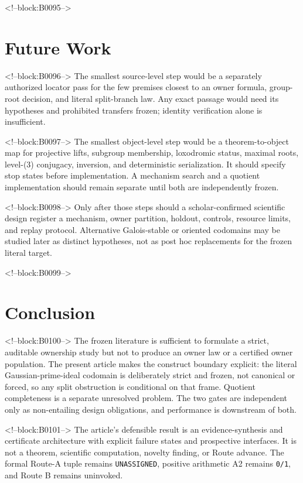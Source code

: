 \documentclass[11pt,a4paper]{article}
\begin{document}
<!--block:B0095-->
\section{Future Work}

<!--block:B0096-->
The smallest source-level step would be a separately authorized locator pass for the few premises closest to an owner formula, group-root decision, and literal split-branch law. Any exact passage would need its hypotheses and prohibited transfers frozen; identity verification alone is insufficient.

<!--block:B0097-->
The smallest object-level step would be a theorem-to-object map for projective lifts, subgroup membership, loxodromic status, maximal roots, level-(3) conjugacy, inversion, and deterministic serialization. It should specify stop states before implementation. A mechanism search and a quotient implementation should remain separate until both are independently frozen.

<!--block:B0098-->
Only after those steps should a scholar-confirmed scientific design register a mechanism, owner partition, holdout, controls, resource limits, and replay protocol. Alternative Galois-stable or oriented codomains may be studied later as distinct hypotheses, not as post hoc replacements for the frozen literal target.

<!--block:B0099-->
\section{Conclusion}

<!--block:B0100-->
The frozen literature is sufficient to formulate a strict, auditable ownership study but not to produce an owner law or a certified owner population. The present article makes the construct boundary explicit: the literal Gaussian-prime-ideal codomain is deliberately strict and frozen, not canonical or forced, so any split obstruction is conditional on that frame. Quotient completeness is a separate unresolved problem. The two gates are independent only as non-entailing design obligations, and performance is downstream of both.

<!--block:B0101-->
The article's defensible result is an evidence-synthesis and certificate architecture with explicit failure states and prospective interfaces. It is not a theorem, scientific computation, novelty finding, or Route advance. The formal Route-A tuple remains \texttt{UNASSIGNED}, positive arithmetic A2 remains \texttt{0/1}, and Route B remains uninvoked.
\end{document}
